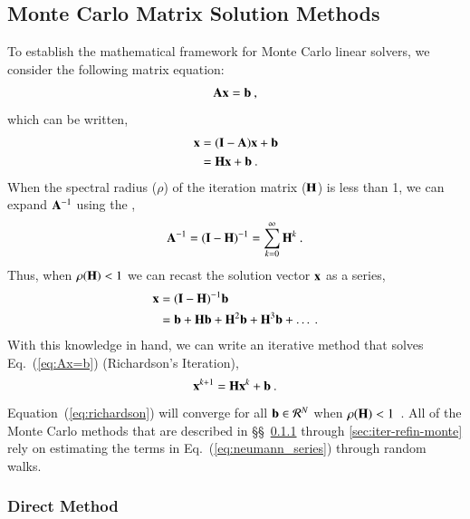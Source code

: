 \documentclass[preprint,12pt]{elsarticle}
\newcommand{\vA}{\ensuremath{\ve{A}}}
\newcommand{\vb}{\ensuremath{\ve{b}}}
\newcommand{\vx}{\ensuremath{\ve{x}}}
\newcommand{\vI}{\ensuremath{\ve{I}}}
\newcommand{\vH}{\ensuremath{\ve{H}}}
\begin{document}
\subsection{Monte Carlo Matrix Solution Methods}
\label{sec:background}
To establish the mathematical framework for Monte Carlo linear
solvers, we consider the following matrix equation:
\begin{equation}
  \vA\vx = \vb\:,
  \label{eq:Ax=b}
\end{equation}
which can be written,
\begin{equation}
  \begin{split}
    \vx &= (\vI - \vA)\vx + \vb\\ &= \vH\vx + \vb\:.
  \end{split}
  \label{eq:point_iteration}
\end{equation}
When the spectral radius ($\rho$) of the iteration matrix ($\vH$) is
less than 1, we can expand $\vA^{-1}$ using the ,
\begin{equation}
  \vA^{-1} = (\vI - \vH)^{-1} = \sum_{k=0}^{\infty} \vH^k\:.
\end{equation} 
Thus, when $\rho(\vH) < 1$ we can recast the solution vector $\vx$ as
a series,
\begin{equation}
  \begin{split}
    \vx &= (\vI - \vH)^{-1}\vb\\ &= \vb + \vH\vb + \vH^2\vb + \vH^3\vb
    + \ldots\:.
    \label{eq:neumann_series}
  \end{split}
\end{equation}
With this knowledge in hand, we can write an iterative method that
solves Eq.~(\ref{eq:Ax=b}) (Richardson's Iteration),
\begin{equation}
  \vx^{k+1} = \vH\vx^k + \vb\:.
  \label{eq:richardson}
\end{equation}
Equation~(\ref{eq:richardson}) will converge for all $\vb \in
\mathcal{R}^{N}$ when $\rho(\vH) < 1$~\cite{kelley_1995}.  All of the
Monte Carlo methods that are described in \S\S~\ref{sec:direct-method}
through \ref{sec:iter-refin-monte} rely on estimating the terms in
Eq.~(\ref{eq:neumann_series}) through random walks.


\subsubsection{Direct Method}
\label{sec:direct-method}
\end{document}

